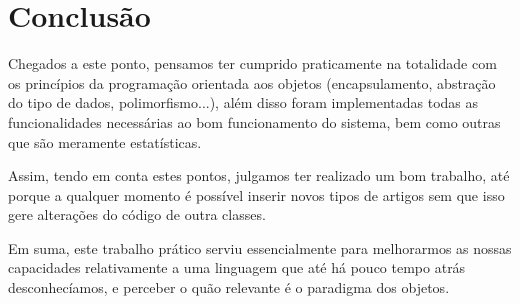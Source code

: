\chapter{Conclusão}

    Chegados a este ponto, pensamos ter cumprido praticamente na totalidade com os princípios da programação orientada aos objetos (encapsulamento, abstração do tipo de dados, polimorfismo...), além disso foram implementadas todas as funcionalidades necessárias ao bom funcionamento do sistema, bem como outras que são meramente estatísticas.

    Assim, tendo em conta estes pontos, julgamos ter realizado um bom trabalho, até porque a qualquer momento é possível inserir novos tipos de artigos sem que isso gere alterações do código de outra classes.

    Em suma, este trabalho prático serviu essencialmente para melhorarmos as nossas capacidades relativamente a uma linguagem que até há pouco tempo atrás desconhecíamos, e perceber o quão relevante é o paradigma dos objetos.